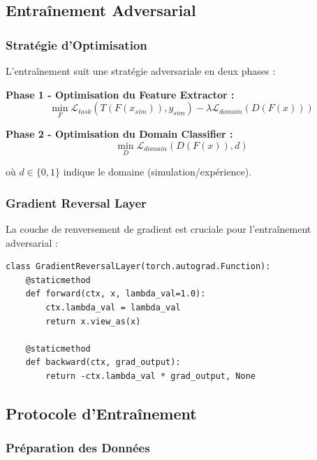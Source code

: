 \documentclass[twocolumn,10pt]{article}
\begin{document}
\subsection{Entraînement Adversarial}

\subsubsection{Stratégie d'Optimisation}

L'entraînement suit une stratégie adversariale en deux phases :

\textbf{Phase 1 - Optimisation du Feature Extractor :}
\begin{equation}
\min_F \mathcal{L}_{task}(T(F(x_{sim})), y_{sim}) - \lambda \mathcal{L}_{domain}(D(F(x)))
\end{equation}

\textbf{Phase 2 - Optimisation du Domain Classifier :}
\begin{equation}
\min_D \mathcal{L}_{domain}(D(F(x)), d)
\end{equation}

où $d \in \{0, 1\}$ indique le domaine (simulation/expérience).

\subsubsection{Gradient Reversal Layer}

La couche de renversement de gradient est cruciale pour l'entraînement adversarial :

\begin{lstlisting}[style=python, caption=Implémentation du Gradient Reversal Layer]
class GradientReversalLayer(torch.autograd.Function):
    @staticmethod
    def forward(ctx, x, lambda_val=1.0):
        ctx.lambda_val = lambda_val
        return x.view_as(x)

    @staticmethod
    def backward(ctx, grad_output):
        return -ctx.lambda_val * grad_output, None
\end{lstlisting}

\subsection{Protocole d'Entraînement}

\subsubsection{Préparation des Données}
\end{document}
